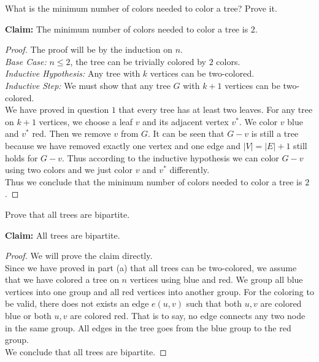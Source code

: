 \documentclass[11pt]{article}
\begin{document}
\begin{Parts}
    \Part What is the minimum number of colors needed to color a tree? Prove it. 
    \begin{Answer}
        \textbf{Claim:} The minimum number of colors needed to color a tree is $2$. 
        \begin{proof}
            The proof will be by the induction on $n$. \\
            \emph{Base Case:} $n \leq 2$, the tree can be trivially colored by $2$ colors. \\
            \emph{Inductive Hypothesis:} Any tree with $k$ vertices can be two-colored. \\
            \emph{Inductive Step:} We must show that any tree $G$ with $k+1$ vertices can be two-colored. \\
            We have proved in question $1$ that every tree has at least two leaves. For any tree on $k+1$
            vertices, we choose a leaf $v$ and its adjacent vertex $v^*$. We color $v$ blue and $v^*$ red.
            Then we remove $v$ from $G$. It can be seen that $G-v$ is still a tree because we have removed 
            exactly one vertex and one edge and $|V|=|E|+1$ still holds for $G-v$. Thus according to the 
            inductive hypothesis we can color $G-v$ using two colors and we just color $v$ and $v^*$ differently. \\
            Thus we conclude that the minimum number of colors needed to color a tree is $2$. 
        \end{proof}
    \end{Answer}

    \Part Prove that all trees are bipartite. 
    \begin{Answer}
        \textbf{Claim:} All trees are bipartite. 
        \begin{proof}
            We will prove the claim directly. \\
            Since we have proved in part (a) that all trees can be two-colored, we assume that we have colored
            a tree on $n$ vertices using blue and red. We group all blue vertices into one group and all red
            vertices into another group. For the coloring to be valid, there does not exists an edge $e(u,v)$
            such that both $u,v$ are colored blue or both $u,v$ are colored red. That is to say, no edge connects
            any two node in the same group. All edges in the tree goes from the blue group to the red group. \\
            We conclude that all trees are bipartite. 
        \end{proof}
    \end{Answer}
\end{Parts}
\end{document}

